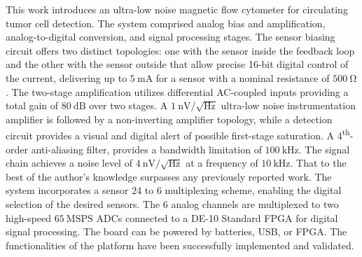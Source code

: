 
\noindent
This work introduces an ultra-low noise magnetic flow cytometer for circulating tumor cell detection. The system comprised analog bias and amplification, analog-to-digital conversion, and signal processing stages. The sensor biasing circuit offers two distinct topologies: one with the sensor inside the feedback loop and the other with the sensor outside that allow precise 16-bit digital control of the current, delivering up to $\mathrm{5~mA}$ for a sensor with a nominal resistance of $\mathrm{500~\Omega}$. The two-stage amplification utilizes differential AC-coupled inputs providing a total gain of $\mathrm{80~dB}$ over two stages. A $\mathrm{1~nV/\sqrt{Hz}}$ ultra-low noise instrumentation amplifier is followed by a non-inverting amplifier topology, while a detection circuit provides a visual and digital alert of possible first-stage saturation. A 4\textsuperscript{th}-order anti-aliasing filter, provides a bandwidth limitation of $\mathrm{100~kHz}$. The signal chain achieves a noise level of $\mathrm{4~nV/\sqrt{Hz}}$ at a frequency of $\mathrm{10~kHz}$. That to the best of the author's knowledge surpasses any previously reported work. The system incorporates a sensor 24 to 6 multiplexing scheme, enabling the digital selection of the desired sensors. The 6 analog channels are multiplexed to two high-speed $\mathrm{65~MSPS}$ ADCs connected to a DE-10 Standard FPGA for digital signal processing. The board can be powered by batteries, USB, or FPGA. The functionalities of the platform have been successfully implemented and validated.
